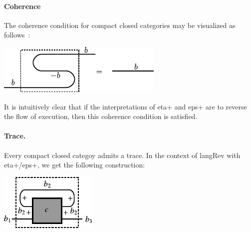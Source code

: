 \documentclass[preprint]{sigplanconf}
\begin{document}
\paragraph*{Coherence}
The coherence condition for compact closed categories may be visualized as
follows~\cite{springerlink:10.1007/978-3-642-12821-94}:
\begin{center}
  \includegraphics{diagrams/coherence.pdf}
\end{center}
It is intuitively clear that if the interpretations of {{eta+}} and {{eps+}}
are to reverse the flow of execution, then this coherence condition is
satisfied.

\paragraph*{Trace.}
Every compact closed categoy admits a trace. In the context of {{langRev}}
with {{eta+}}/{{eps+}}, we get the following construction:

\begin{multicols}{2}
\begin{center}
  \includegraphics{diagrams/trace.pdf}
\end{center}


\end{multicols}

\end{document}
